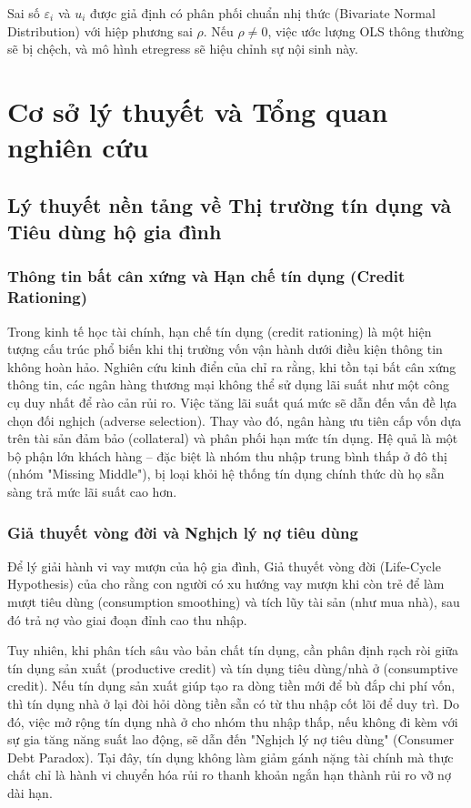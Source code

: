 \documentclass[12pt,a4paper]{report}
\begin{document}
Sai số $\varepsilon_i$ và $u_i$ được giả định có phân phối chuẩn nhị thức (Bivariate Normal Distribution) với hiệp phương sai $\rho$. Nếu $\rho \neq 0$, việc ước lượng OLS thông thường sẽ bị chệch, và mô hình etregress sẽ hiệu chỉnh sự nội sinh này.

\chapter{Cơ sở lý thuyết và Tổng quan nghiên cứu}

\section{Lý thuyết nền tảng về Thị trường tín dụng và Tiêu dùng hộ gia đình}

\subsection{Thông tin bất cân xứng và Hạn chế tín dụng (Credit Rationing)}
Trong kinh tế học tài chính, hạn chế tín dụng (credit rationing) là một hiện tượng cấu trúc phổ biến khi thị trường vốn vận hành dưới điều kiện thông tin không hoàn hảo. Nghiên cứu kinh điển của \textcite{Stiglitz1981} chỉ ra rằng, khi tồn tại bất cân xứng thông tin, các ngân hàng thương mại không thể sử dụng lãi suất như một công cụ duy nhất để rào cản rủi ro. Việc tăng lãi suất quá mức sẽ dẫn đến vấn đề lựa chọn đối nghịch (adverse selection). Thay vào đó, ngân hàng ưu tiên cấp vốn dựa trên tài sản đảm bảo (collateral) và phân phối hạn mức tín dụng. Hệ quả là một bộ phận lớn khách hàng – đặc biệt là nhóm thu nhập trung bình thấp ở đô thị (nhóm "Missing Middle"), bị loại khỏi hệ thống tín dụng chính thức dù họ sẵn sàng trả mức lãi suất cao hơn.



\subsection{Giả thuyết vòng đời và Nghịch lý nợ tiêu dùng}
Để lý giải hành vi vay mượn của hộ gia đình, Giả thuyết vòng đời (Life-Cycle Hypothesis) của \textcite{Modigliani1963} cho rằng con người có xu hướng vay mượn khi còn trẻ để làm mượt tiêu dùng (consumption smoothing) và tích lũy tài sản (như mua nhà), sau đó trả nợ vào giai đoạn đỉnh cao thu nhập. 

Tuy nhiên, khi phân tích sâu vào bản chất tín dụng, cần phân định rạch ròi giữa tín dụng sản xuất (productive credit) và tín dụng tiêu dùng/nhà ở (consumptive credit). Nếu tín dụng sản xuất giúp tạo ra dòng tiền mới để bù đắp chi phí vốn, thì tín dụng nhà ở lại đòi hỏi dòng tiền sẵn có từ thu nhập cốt lõi để duy trì. Do đó, việc mở rộng tín dụng nhà ở cho nhóm thu nhập thấp, nếu không đi kèm với sự gia tăng năng suất lao động, sẽ dẫn đến "Nghịch lý nợ tiêu dùng" (Consumer Debt Paradox). Tại đây, tín dụng không làm giảm gánh nặng tài chính mà thực chất chỉ là hành vi chuyển hóa rủi ro thanh khoản ngắn hạn thành rủi ro vỡ nợ dài hạn.
\end{document}
